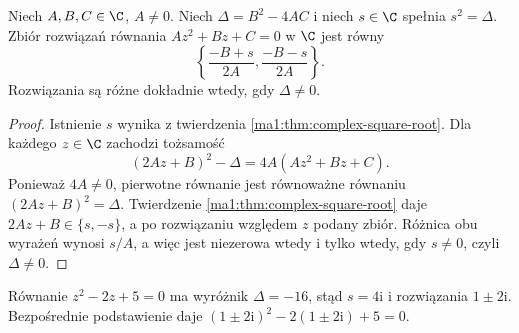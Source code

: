 \begin{twierdzenie}
\label{ma1:thm:complex-quadratic}
Niech $A,B,C\in\C$, $A\ne0$. Niech $\Delta=B^2-4AC$ i niech $s\in\C$ spełnia $s^2=\Delta$. Zbiór rozwiązań równania $Az^2+Bz+C=0$ w $\C$ jest równy
\[
 \left\{\frac{-B+s}{2A},\frac{-B-s}{2A}\right\}.
\]
Rozwiązania są różne dokładnie wtedy, gdy $\Delta\ne0$.
\end{twierdzenie}
\begin{proof}
Istnienie $s$ wynika z twierdzenia \ref{ma1:thm:complex-square-root}. Dla każdego $z\in\C$ zachodzi tożsamość
\[
 (2Az+B)^2-\Delta=4A(Az^2+Bz+C).
\]
Ponieważ $4A\ne0$, pierwotne równanie jest równoważne równaniu $(2Az+B)^2=\Delta$. Twierdzenie \ref{ma1:thm:complex-square-root} daje $2Az+B\in\{s,-s\}$, a po rozwiązaniu względem $z$ podany zbiór. Różnica obu wyrażeń wynosi $s/A$, a więc jest niezerowa wtedy i tylko wtedy, gdy $s\ne0$, czyli $\Delta\ne0$.
\end{proof}
\begin{przyklad}
Równanie $z^2-2z+5=0$ ma wyróżnik $\Delta=-16$, stąd $s=4\mathrm i$ i rozwiązania $1\pm2\mathrm i$. Bezpośrednie podstawienie daje $(1\pm2\mathrm i)^2-2(1\pm2\mathrm i)+5=0$.
\end{przyklad}

